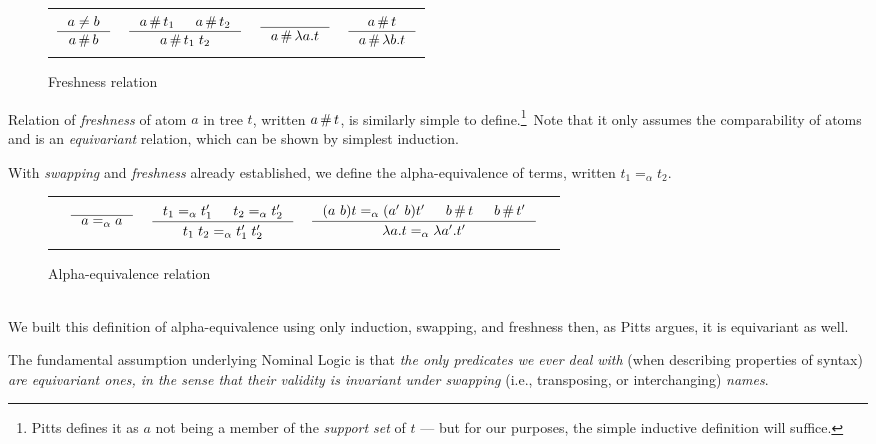 \documentclass[english, mgr]{iithesis}
\renewcommand{\it}[1]{\textit{#1}}
\newcommand{\aequiv}{\ensuremath{=_\alpha}}
\begin{document}
\begin{figure}[htbp]
  \centering
    \begin{tabularx}{\textwidth}{|CCCC|}
      \hline & & & \\
      $
      \inference{
        a \cneq b
      }{
        a \cfresh b
      }
      $ & $
      \inference{
        a \cfresh t_1 & a \cfresh t_2
      }{
        a \cfresh t_1\;t_2
      }
      $ & $
      \inference{
      }{
        a \cfresh \lambda a . t
      }
      $ & $
      \inference{
        a \cfresh t
      }{
        a \cfresh \lambda b . t
      }
      $ \\ & & & \\ \hline
    \end{tabularx}
  \caption{Freshness relation}
  \label{fig:fresh}
\end{figure}
Relation of \it{freshness} of atom $a$ in tree $t$, written $a \,\#\, t$,
is similarly simple to define.\footnote{Pitts defines it as
$a$ not being a member of the \it{support set} of $t$ ---
but for our purposes, the simple inductive definition will suffice.}\
Note that it only assumes the comparability of atoms
and is an \it{equivariant} relation, which can be shown by simplest induction.

With \it{swapping} and \it{freshness} already established,
we define the alpha-equivalence of terms, written $t_1 \aequiv t_2$.
\begin{figure}[htbp]
  \centering
    \begin{tabularx}{\textwidth}{|ccCcc|}
    \hline & & & & \\ {} &
    $
    \inference{
      \text{}
    }{
      a \aequiv a
    }
    $ & $
    \inference{
      t_1 \aequiv t_1' & t_2 \aequiv t_2'
    }{
      t_1\;t_2 \aequiv t_1'\;t_2'
    }
    $ & $
    \inference{
      \permswap{a}{b}{t} \aequiv \permswap{a'}{b}{t'} & b \cfresh t & b \cfresh t'
    }{
      \lambda a . t \aequiv \lambda a' . t'
    }
    $ & {} \\ & & & & \\ \hline
    \end{tabularx}
  \caption{Alpha-equivalence relation}
  \label{fig:fresh}
\end{figure}
\\
We built this definition of alpha-equivalence using only induction,
swapping, and freshness then, as Pitts argues, it is equivariant as well.
\\
\begin{mdframed}[frametitle={\textnormal{\footnotesize \textbf{\citeauthor{nominal-logic}}, \textit{\citetitle{nominal-logic}}\cite{nominal-logic}:}}]
The fundamental assumption underlying Nominal Logic is that \textit{the only predicates we ever deal with} (when describing properties of syntax) \textit{are equivariant ones, in the sense that their validity is invariant under swapping} (i.e., transposing, or interchanging) \textit{names}.
\end{mdframed}
\end{document}
